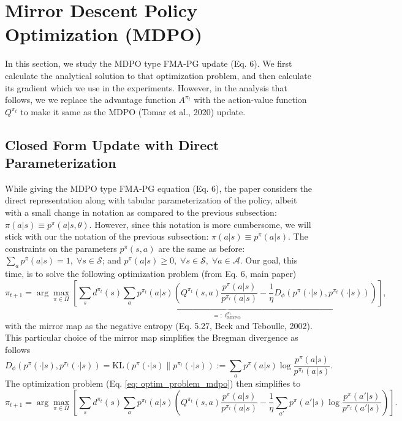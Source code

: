 \documentclass[a4paper, 10pt]{article}
\begin{document}
\section{Mirror Descent Policy Optimization (MDPO)}
In this section, we study the MDPO type FMA-PG update (Eq. 6). We first calculate the analytical solution to that optimization problem, and then calculate its gradient which we use in the experiments. However, in the analysis that follows, we we replace the advantage function $A^{\pi_t}$ with the action-value function $Q^{\pi_t}$ to make it same as the MDPO (Tomar et al., 2020) update.
\subsection{Closed Form Update with Direct Parameterization}
While giving the MDPO type FMA-PG equation (Eq. 6), the paper considers the direct representation along with tabular parameterization of the policy, albeit with a small change in notation as compared to the previous subsection: $\pi(a|s) \equiv p^\pi(a|s, \theta)$. However, since this notation is more cumbersome, we will stick with our the notation of the previous subsection: $\pi(a|s) \equiv p^\pi(a|s)$. The constraints on the parameters $p^\pi(s, a)$ are the same as before: $\sum_a p^\pi(a | s) = 1, \; \forall s \in \mathcal{S}$; and $p^\pi(a | s) \geq 0, \; \forall s \in \mathcal{S}, \; \forall a \in \mathcal{A}$. Our goal, this time, is to solve the following optimization problem (from Eq. 6, main paper)
\begin{equation}
  \pi_{t+1} = \arg\max_{\pi \in \Pi} \underbrace{\left[ \sum_s d^{\pi_t}(s) \sum_a p^{\pi_t}(a|s) \left( Q^{\pi_t}(s, a) \frac{p^\pi(a | s)}{p^{\pi_t}(a | s)} - \frac{1}{\eta} D_\phi (p^\pi(\cdot | s), p^{\pi_t}(\cdot | s)) \right) \right]}_{=: \ell^{\pi_t}_{\text{MDPO}}}, \label{eq: optim_problem_mdpo}
\end{equation}
with the mirror map as the negative entropy (Eq. 5.27, Beck and Teboulle, 2002). This particular choice of the mirror map simplifies the Bregman divergence as follows
\begin{equation}
  D_\phi (p^\pi(\cdot | s), p^{\pi_t}(\cdot | s)) = \text{KL}(p^\pi(\cdot | s) \| p^{\pi_t}(\cdot | s)) := \sum_a p^\pi(a | s) \log \frac{p^\pi(a | s)}{p^{\pi_t}(a | s)}.
\end{equation}
The optimization problem (Eq. \ref{eq: optim_problem_mdpo}) then simplifies to
\begin{equation}
  \pi_{t+1} = \arg\max_{\pi \in \Pi} \left[ \sum_s d^{\pi_t}(s) \sum_a p^{\pi_t}(a|s) \left( Q^{\pi_t}(s, a) \frac{p^\pi(a | s)}{p^{\pi_t}(a | s)} - \frac{1}{\eta} \sum_{a'} p^\pi(a' | s) \log \frac{p^\pi(a' | s)}{p^{\pi_t}(a' | s)} \right) \right].
\end{equation}
\end{document}
